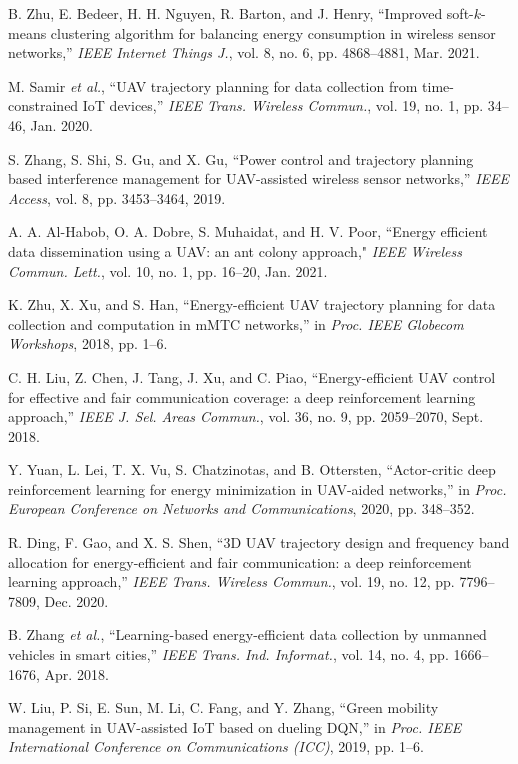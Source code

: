 \documentclass[journal]{IEEEtran}
\begin{document}
\begin{thebibliography}{1}
		
		 {B. Zhu, E. Bedeer, H. H. Nguyen, R. Barton, and J. Henry, ``Improved soft-$k$-means clustering algorithm for balancing energy consumption in wireless sensor networks,'' \emph{IEEE Internet Things J.}, vol. 8, no. 6, pp. 4868--4881, Mar. 2021.}
		

        {M. Samir \emph{et al.}, ``UAV trajectory planning for data collection from time-constrained IoT devices,'' \emph{IEEE Trans. Wireless Commun.}, vol. 19, no. 1, pp. 34--46, Jan. 2020.}

         {S. Zhang, S. Shi, S. Gu, and X. Gu, ``Power control and trajectory planning based interference management for UAV-assisted wireless sensor networks,'' \emph{IEEE Access}, vol. 8, pp. 3453--3464, 2019.}

       {A. A. Al-Habob, O. A. Dobre, S. Muhaidat, and H. V. Poor, ``Energy efficient data dissemination using a UAV: an ant colony approach," \emph{IEEE Wireless Commun. Lett.}, vol. 10, no. 1, pp. 16--20, Jan. 2021.}

        {K. Zhu, X. Xu, and S. Han, ``Energy-efficient UAV trajectory planning for data collection and computation in mMTC networks,'' in \emph{Proc. IEEE Globecom Workshops}, 2018, pp. 1--6.}


        {C. H. Liu, Z. Chen, J. Tang, J. Xu, and C. Piao, ``Energy-efficient UAV control for effective and fair communication coverage: a deep reinforcement learning approach,'' \emph{IEEE J. Sel. Areas Commun.}, vol. 36, no. 9, pp. 2059--2070, Sept. 2018.}

         {Y. Yuan, L. Lei, T. X. Vu, S. Chatzinotas, and B. Ottersten, ``Actor-critic deep reinforcement learning for energy minimization in UAV-aided networks,'' in \emph{Proc. European Conference on Networks and Communications}, 2020, pp. 348--352.}


         {R. Ding, F. Gao, and X. S. Shen, ``3D UAV trajectory design and frequency band allocation for energy-efficient and fair communication: a deep reinforcement learning approach,'' \emph{IEEE Trans. Wireless Commun.}, vol. 19, no. 12, pp. 7796--7809, Dec. 2020.}

         {B. Zhang \emph{et al.}, ``Learning-based energy-efficient data collection by unmanned vehicles in smart cities,''  \emph{IEEE Trans. Ind. Informat.}, vol. 14, no. 4, pp. 1666--1676, Apr. 2018.}


         {W. Liu, P. Si, E. Sun, M. Li, C. Fang, and Y. Zhang, ``Green mobility management in UAV-assisted IoT based on dueling DQN,'' in \emph{Proc. IEEE International Conference on Communications (ICC)}, 2019, pp. 1--6.}



\end{thebibliography}
\end{document}

